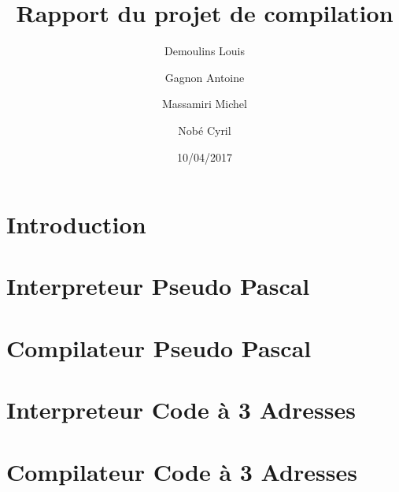 \documentclass{article}
\title{Rapport du projet de compilation}
\date{10/04/2017}
\author{Demoulins Louis \and Gagnon Antoine \and Massamiri Michel \and Nobé Cyril}
\begin{document}
\maketitle


\newpage
\section{Introduction}


\newpage
\section{Interpreteur Pseudo Pascal}


\newpage
\section{Compilateur Pseudo Pascal}



\newpage
\section{Interpreteur Code à 3 Adresses}



\newpage
\section{Compilateur Code à 3 Adresses}
\end{document}
